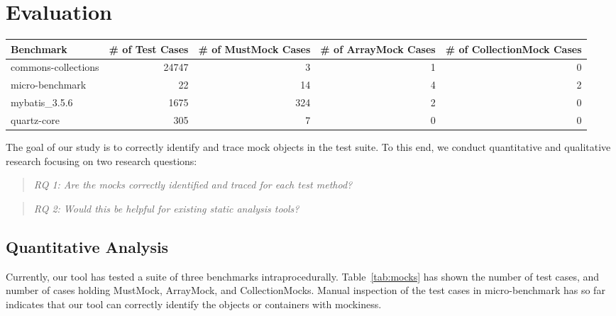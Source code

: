 \section{Evaluation}
\label{sec:evaluation}

\begin{table*}[b]
	\centering
	\caption{Counts of unit test cases containing MustMock object, counts of unit test cases with array containing mock, and counts of unit test cases with collection containing mock in the 3 benchmarks.}
	\begin{tabular}{lrrrr}
		\toprule
		Benchmark & \# of Test Cases & \# of MustMock Cases  & \# of ArrayMock Cases & \# of CollectionMock Cases \\
		\midrule
		commons-collections           			&  24747       &  3   & 1 & 0       \\
		micro-benchmark         		  		&  22    &  14   & 4 & 2       \\
		mybatis\_3.5.6         		  		&  1675    &  324   & 2 & 0       \\
		
		quartz-core         	  			&  305     &  7   & 0 & 0      \\
		\bottomrule
	\end{tabular}
	\label{tab:mocks}
\end{table*}

The goal of our study is to correctly identify and trace mock objects in the test suite. To this end, we conduct quantitative and qualitative research focusing on two research questions:

\begin{quote}
	\emph{RQ 1: Are the mocks correctly identified and traced for each test method?}
\end{quote}

\begin{quote}
	\emph{RQ 2: Would this be helpful for existing static analysis tools?}
\end{quote}

\subsection{Quantitative Analysis}
\label{subsec:effectiveness}

Currently, our tool has tested a suite of three benchmarks intraprocedurally. Table~\ref{tab:mocks} has shown the number of test cases, and number of cases holding MustMock, ArrayMock, and CollectionMocks. Manual inspection of the test cases in micro-benchmark has so far indicates that our tool can correctly identify the objects or containers with mockiness. 

